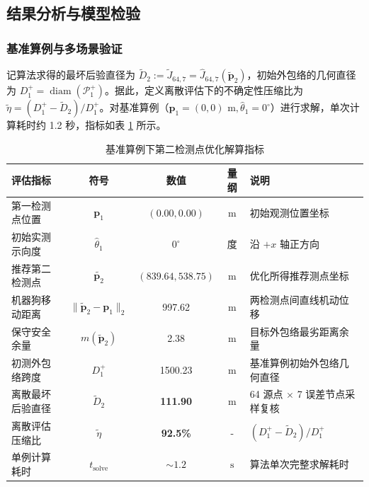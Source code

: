 \documentclass[zihao=-4,a4paper,UTF8]{ctexart}
\begin{document}
\subsection{结果分析与模型检验}

\subsubsection{基准算例与多场景验证}

记算法求得的最坏后验直径为 $\widetilde{D}_2 := \widetilde{J}_{64,7} = \widehat{J}_{64,7}(\widetilde{\mathbf{p}}_2)$，初始外包络的几何直径为 $D_1^+ = \operatorname{diam}(\mathcal{P}_1^+)$。据此，定义离散评估下的不确定性压缩比为 $\widetilde{\eta} = (D_1^+ - \widetilde{D}_2)/D_1^+$。对基准算例（$\mathbf{p}_1 = (0, 0)\text{ m}, \hat\theta_1 = 0^\circ$）进行求解，单次计算耗时约 1.2 秒，指标如表 \ref{tab:q2_results} 所示。

\begin{table}[htbp]
    \centering
    \small
    \caption{基准算例下第二检测点优化解算指标}
    \label{tab:q2_results}
    \renewcommand{\arraystretch}{1.08}
    \begin{tabularx}{\linewidth}{X c c c X}
        \toprule[1.5pt]
        \textbf{评估指标} & \textbf{符号} & \textbf{数值} & \textbf{量纲} & \textbf{说明} \\
        \midrule
        第一检测点位置 & $\mathbf{p}_1$ & $(0.00, 0.00)$ & $\text{m}$ & 初始观测位置坐标 \\
        初始实测示向度 & $\hat\theta_1$ & $0^\circ$ & 度 & 沿 $+x$ 轴正方向 \\
        推荐第二检测点 & $\widetilde{\mathbf{p}_2}$ & $(839.64, 538.75)$ & $\text{m}$ & 优化所得推荐测点坐标 \\
        机器狗移动距离 & $\|\widetilde{\mathbf{p}}_2 - \mathbf{p}_1\|_2$ & 997.62 & $\text{m}$ & 两检测点间直线机动位移 \\
        保守安全余量 & $m(\widetilde{\mathbf{p}}_2)$ & 2.38 & $\text{m}$ & 目标外包络最劣距离余量 \\
        初测外包络跨度 & $D_1^+$ & 1500.23 & $\text{m}$ & 基准算例初始外包络几何直径 \\
        离散最坏后验直径 & $\widetilde{D}_2$ & \textbf{111.90} & $\text{m}$ & 64 源点 $\times$ 7 误差节点采样复核 \\
        离散评估压缩比 & $\widetilde{\eta}$ & \textbf{92.5\%} & - & $(D_1^+ - \widetilde{D}_2)/D_1^+$ \\
        单例计算耗时 & $t_{\text{solve}}$ & $\sim 1.2$ & $\text{s}$ & 算法单次完整求解耗时 \\
        \bottomrule[1.5pt]
    \end{tabularx}
\end{table}
\end{document}
